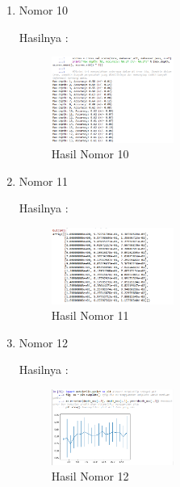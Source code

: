 \begin{enumerate}
\item Nomor 10
\hfill\break
	
Hasilnya :
\begin{figure}[H]
		\includegraphics[width=4cm]{figures/1174054/2/10.png}
		\centering
		\caption{Hasil Nomor 10}
\end{figure}

\item Nomor 11
\hfill\break
	
Hasilnya :
\begin{figure}[H]
		\includegraphics[width=4cm]{figures/1174054/2/11.png}
		\centering
		\caption{Hasil Nomor 11}
\end{figure}

\item Nomor 12
\hfill\break
	
Hasilnya :
\begin{figure}[H]
		\includegraphics[width=4cm]{figures/1174054/2/12.png}
		\centering
		\caption{Hasil Nomor 12}
\end{figure}
\end{enumerate}
